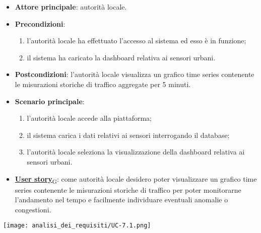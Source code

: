\begin{itemize}
	\item \textbf{Attore principale}: autorità locale.
	\item \textbf{Precondizioni}:
	      \begin{enumerate}
		      \item l'autorità locale ha effettuato l'accesso al sistema ed esso è in funzione;
		      \item il sistema ha caricato la dashboard relativa ai sensori urbani.
	      \end{enumerate}
	\item \textbf{Postcondizioni}: l'autorità locale visualizza un grafico time series contenente le misurazioni storiche di traffico aggregate per 5 minuti.
	\item \textbf{Scenario principale}:
	      \begin{enumerate}
		      \item l'autorità locale accede alla piattaforma;
		      \item il sistema carica i dati relativi ai sensori interrogando il database;
		      \item l'autorità locale seleziona la visualizzazione della dashboard relativa ai sensori urbani.
	      \end{enumerate}
	\item \href{https://7last.github.io/docs/pb/documentazione-interna/glossario\#user-story}{\textbf{User story}\textsubscript{G}}:
	      come autorità locale desidero poter visualizzare un grafico time series contenente le misurazioni storiche
	      di traffico per poter monitorarne l'andamento nel tempo e facilmente individuare eventuali anomalie
	      o congestioni.
\end{itemize}
\begin{center}
	\texttt{[image: analisi\_dei\_requisiti/UC-7.1.png]}
\end{center}


